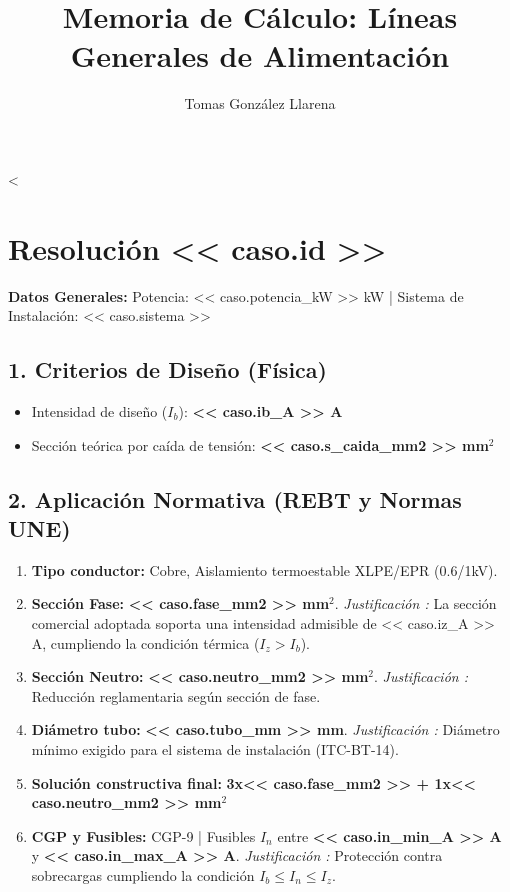 \documentclass{article}
\begin{document}
\title{Memoria de Cálculo: Líneas Generales de Alimentación}
\author{Tomas González Llarena}
\maketitle

<%
\section*{Resolución << caso.id >>}
\textbf{Datos Generales:} Potencia: << caso.potencia_kW >> kW | Sistema de Instalación: << caso.sistema >>

\subsection*{1. Criterios de Diseño (Física)}
\begin{itemize}
    \item Intensidad de diseño ($I_b$): \textbf{<< caso.ib_A >> A}
    \item Sección teórica por caída de tensión: \textbf{<< caso.s_caida_mm2 >> mm$^2$}
\end{itemize}

\subsection*{2. Aplicación Normativa (REBT y Normas UNE)}
\begin{enumerate}
    \item \textbf{Tipo conductor:} Cobre, Aislamiento termoestable XLPE/EPR (0.6/1kV).
    \item \textbf{Sección Fase:} \textbf{<< caso.fase_mm2 >> mm$^2$}. \textit{Justificación \cite{une_hd_60364_5_52}:} La sección comercial adoptada soporta una intensidad admisible de << caso.iz_A >> A, cumpliendo la condición térmica ($I_z > I_b$).
    \item \textbf{Sección Neutro:} \textbf{<< caso.neutro_mm2 >> mm$^2$}. \textit{Justificación \cite{guia_bt_14}:} Reducción reglamentaria según sección de fase.
    \item \textbf{Diámetro tubo:} \textbf{<< caso.tubo_mm >> mm}. \textit{Justificación \cite{rebt_rd842}:} Diámetro mínimo exigido para el sistema de instalación (ITC-BT-14).
    \item \textbf{Solución constructiva final:} \textbf{3x<< caso.fase_mm2 >> + 1x<< caso.neutro_mm2 >> mm$^2$}
    \item \textbf{CGP y Fusibles:} CGP-9 | Fusibles $I_n$ entre \textbf{<< caso.in_min_A >> A} y \textbf{<< caso.in_max_A >> A}. \textit{Justificación \cite{rebt_rd842}:} Protección contra sobrecargas cumpliendo la condición $I_b \leq I_n \leq I_z$.
\end{enumerate}
\end{document}
